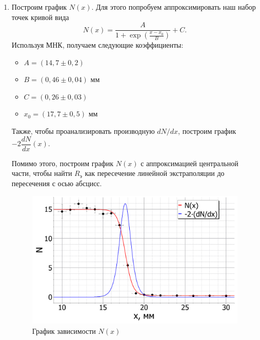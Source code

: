\begin{enumerate}
	
		\item Построим график $N(x)$. Для этого попробуем аппроксимировать наш набор точек кривой вида
		\begin{equation*}
			N(x) = \frac{A}{1 + \exp{\left(\frac{x - x_0}{B}\right)}} + C.
		\end{equation*}
		Используя МНК, получаем следующие коэффициенты:
		\begin{itemize}
			\item $A = (14,7 \pm 0,2)$
			
			\item $B = (0,46 \pm 0,04) \text{ мм}$
			
			\item $C = (0,26 \pm 0,03)$
			
			\item $x_0 = (17,7 \pm 0,5) \text{ мм}$
		\end{itemize}
	
		Также, чтобы проанализировать производную $dN/dx$, построим график $-2\dfrac{dN}{dx}(x)$.
		
		Помимо этого, построим график $N(x)$ с аппроксимацией центральной части, чтобы найти $R_\text{э}$ как пересечение линейной экстраполяции до пересечения с осью абсцисс.
		
	
		\begin{figure}[h!]
			\centering
			\includegraphics[width=0.98\linewidth]{Pictures/Geiger_PlotNoFit.pdf}
			\caption{График зависимости $N(x)$}
		\end{figure}
		

\end{enumerate}
